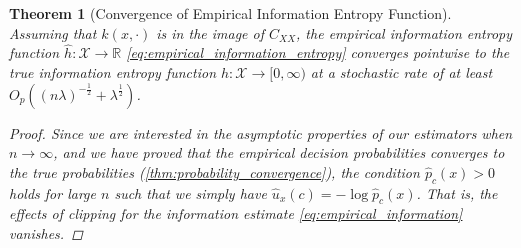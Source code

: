 \documentclass{article}
\newtheorem{theorem}{Theorem}[section]
\begin{document}
		\begin{theorem}[Convergence of Empirical Information Entropy Function]
			\label{thm:entropy_convergence}
			Assuming that $k(x, \cdot)$ is in the image of $C_{XX}$, the empirical information entropy function $\hat{h} : \mathcal{X} \to \mathbb{R}$ \eqref{eq:empirical_information_entropy} converges pointwise to the true information entropy function $h : \mathcal{X} \to [0, \infty)$ at a stochastic rate of at least $O_{p}((n \lambda)^{-\frac{1}{2}} + \lambda^{\frac{1}{2}})$.
			
			\begin{proof}
				Since we are interested in the asymptotic properties of our estimators when $n \to \infty$, and we have proved that the empirical decision probabilities converges to the true probabilities (\cref{thm:probability_convergence}), the condition $\hat{p}_{c}(x) > 0$ holds for large $n$ such that we simply have $\hat{u}_{x}(c) = - \log{\hat{p}_{c}(x)}$. That is, the effects of clipping for the information estimate \eqref{eq:empirical_information} vanishes.
				

\end{proof}
\end{theorem}
\end{document}
